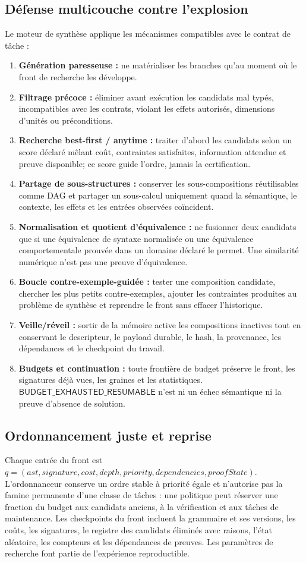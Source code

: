 \documentclass[11pt,a4paper]{article}
\theoremstyle{definition}
\theoremstyle{plain}
\theoremstyle{remark}
\begin{document}
\subsection{Défense multicouche contre l'explosion}
Le moteur de synthèse applique les mécanismes compatibles avec le contrat de tâche :
\begin{enumerate}
\item \textbf{Génération paresseuse :} ne matérialiser les branches qu'au moment où le front de recherche les développe.
\item \textbf{Filtrage précoce :} éliminer avant exécution les candidats mal typés, incompatibles avec les contrats, violant les effets autorisés, dimensions d'unités ou préconditions.
\item \textbf{Recherche best-first / anytime :} traiter d'abord les candidats selon un score déclaré mêlant coût, contraintes satisfaites, information attendue et preuve disponible; ce score guide l'ordre, jamais la certification.
\item \textbf{Partage de sous-structures :} conserver les sous-compositions réutilisables comme DAG et partager un sous-calcul uniquement quand la sémantique, le contexte, les effets et les entrées observées coïncident.
\item \textbf{Normalisation et quotient d'équivalence :} ne fusionner deux candidats que si une équivalence de syntaxe normalisée ou une équivalence comportementale prouvée dans un domaine déclaré le permet. Une similarité numérique n'est pas une preuve d'équivalence.
\item \textbf{Boucle contre-exemple-guidée :} tester une composition candidate, chercher les plus petits contre-exemples, ajouter les contraintes produites au problème de synthèse et reprendre le front sans effacer l'historique.
\item \textbf{Veille/réveil :} sortir de la mémoire active les compositions inactives tout en conservant le descripteur, le payload durable, le hash, la provenance, les dépendances et le checkpoint du travail.
\item \textbf{Budgets et continuation :} toute frontière de budget préserve le front, les signatures déjà vues, les graines et les statistiques. \(\mathsf{BUDGET\_EXHAUSTED\_RESUMABLE}\) n'est ni un échec sémantique ni la preuve d'absence de solution.
\end{enumerate}

\subsection{Ordonnancement juste et reprise}
Chaque entrée du front est \(q=(ast,signature,cost,depth,priority,dependencies,proofState)\). L'ordonnanceur conserve un ordre stable à priorité égale et n'autorise pas la famine permanente d'une classe de tâches : une politique peut réserver une fraction du budget aux candidats anciens, à la vérification et aux tâches de maintenance. Les checkpoints du front incluent la grammaire et ses versions, les coûts, les signatures, le registre des candidats éliminés avec raisons, l'état aléatoire, les compteurs et les dépendances de preuves. Les paramètres de recherche font partie de l'expérience reproductible.
\end{document}
